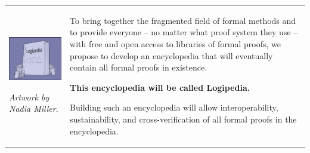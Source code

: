 \hspace{-0.8cm}
\begin{tabular}{p{}p{}}
\begin{minipage}{7cm}

\includegraphics[width=7cm]{img/Illustration3-reduced.jpg}

{\em \small Artwork by Nadia Miller.}

\end{minipage}
&
\begin{minipage}{9.85cm}

To bring together the fragmented field of formal methods and to
provide everyone -- no matter what proof system they use -- with free
and open access to libraries of formal proofs, we propose to develop
an encyclopedia that will eventually contain all formal proofs in
existence.

\begin{center} \textbf{This encyclopedia will be called Logipedia.} \end{center}

Building such an encyclopedia will allow interoperability,
sustainability, and cross-verification of all formal proofs in the
encyclopedia.
  
\end{minipage}
\\
\end{tabular}

\medskip


